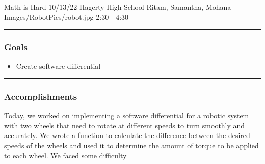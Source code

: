 \insertmeeting 
	{Math is Hard} 
	{10/13/22} 
	{Hagerty High School}
	{Ritam, Samantha, Mohana}
	{Images/RobotPics/robot.jpg}
	{2:30 - 4:30}
	
\noindent\hfil\rule{\textwidth}{.4pt}\hfil
\subsubsection*{Goals}
\begin{itemize}
    \item Create software differential

\end{itemize} 

\noindent\hfil\rule{\textwidth}{.4pt}\hfil

\subsubsection*{Accomplishments}
Today, we worked on implementing a software differential for a robotic system with two wheels that need to rotate at different speeds to turn smoothly and accurately. We wrote a function to calculate the difference between the desired speeds of the wheels and used it to determine the amount of torque to be applied to each wheel. We faced some difficulty 


